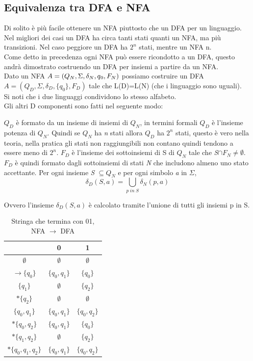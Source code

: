 \documentclass[12pt]{article}
\begin{document}
	\subsection{Equivalenza tra DFA e NFA}
	Di solito è più facile ottenere un NFA piuttosto che un DFA per un linguaggio. Nel migliori dei casi un DFA ha circa tanti stati quanti un NFA, ma più transizioni. Nel caso peggiore un DFA ha $2^n$ stati, mentre un NFA n.
	\\ Come detto in precedenza ogni NFA può essere ricondotto a un DFA, questo andrà dimostrato costruendo un DFA per insiemi a partire da un NFA.
	\\ Dato un NFA $A = (Q_N, \Sigma, \delta_N, q\textsubscript{0}, F_N)$ possiamo costruire un DFA \\ $A = (Q_D, \Sigma, \delta_D, \{q_0\}, F_D)$ tale che L(D)=L(N) (che i linguaggio sono uguali).
	\\ Si noti che i due linguaggi condividono lo stesso alfabeto.
	\\ Gli altri D componenti sono fatti nel seguente modo:
	\begin{outline}
		\1 $Q_D$ è formato da un insieme di insiemi di $Q_N$, in termini formali $Q_D$ è l'insieme potenza di $Q_N$. Quindi se $Q_N$ ha \emph{n} stati allora $Q_D$ ha $2^n$ stati, questo è vero nella teoria, nella pratica gli stati non raggiungibili non contano quindi tendono a essere meno di $2^n$.
		\1 $F_D$ è l'insieme dei sottoinsiemi di S di $Q_N$ tale che \emph{S}$ \cap F_N \ne \emptyset$. $F_D$ è quindi formato dagli sottoinsiemi di stati \emph{N} che includono almeno uno stato accettante.
		\1 Per ogni insieme \emph{S} $\subseteq Q_N$ e per ogni simbolo \emph{a} in $\Sigma$,
		\[\delta_D(S,a) = \bigcup_{p\;in\;S} \delta_N(p,a)\]
	\end{outline}
	Ovvero l'insieme $\delta_D(S,a)$ è calcolato tramite l'unione di tutti gli insiemi p in S.
	\begin{table}[ht]
		\centering
		\begin{tabular}{c || c | c}
			                        & 0                 & 1               \\
			\hline \hline
			$ \emptyset $           & $ \emptyset $     & $ \emptyset $   \\
			$ \rightarrow \{q_0\} $ & $ \{q_0, q_1\} $  & $ \{q_0\} $     \\
			$ \{q_1\} $             & $ \emptyset $     & $ \{q_2\} $     \\
			$ *\{q_2\} $            & $ \emptyset $     & $ \emptyset $   \\
			$ \{q_0,q_1\} $         & $  \{q_0, q_1\} $ & $ \{q_0,q_2\} $ \\
			$ *\{q_0,q_2\} $        & $ \{q_0, q_1\} $  & $ \{q_0\} $     \\
			$ *\{q_1,q_2\} $        & $ \emptyset $     & $ \{q_2\} $     \\
			$ *\{q_0, q_1, q_2\} $  & $ \{q_0,q_1\} $   & $ \{q_0,q_2\} $ \\
		\end{tabular}
		\caption{Stringa che termina con 01, NFA $\rightarrow$ DFA}
	\end{table}
\end{document}
